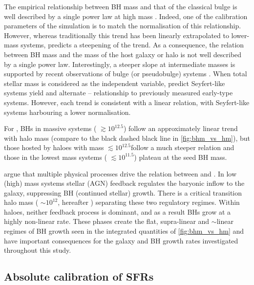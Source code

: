 The empirical relationship between BH mass and that of the classical bulge is
well described by a single power law at high mass \citep[e.g,][with gradient
values of $\alpha \approx 1-1.3$ satisfying
\cref{eq:slope1}]{Magorrian1998,Kormendy2013,McConnellandMa2013}.  Indeed, one
of the calibration parameters of the simulation is to match the normalisation
of this relationship.  However, whereas traditionally this trend has been
linearly extrapolated to lower-mass systems, \eagle predicts a steepening of
the trend.  As a consequence, the relation between BH mass and the mass of the
host galaxy or halo is not well described by a single power law. Interestingly,
a steeper slope at intermediate masses is supported by recent observations of
bulge (or pseudobulge) systems \citep[e.g,][]{Scott2013,Greene2016}.  When
total stellar mass is considered as the independent variable,
\citet{Reines2015} predict Seyfert-like systems yield and alternate
--\M{*} relationship to previously measured early-type systems. However,
each trend is consistent with a linear relation, with Seyfert-like systems
harbouring a lower normalisation.

For \eagle, BHs in massive systems ( $\gtrsim 10^{12.5}$\Msol) follow an
approximately linear trend with halo mass (compare to the black dashed black
line in \cref{fig:bhm_vs_hm}), but those hosted by haloes with mass 
$\lesssim 10^{12.5}$\Msol follow a much steeper relation and those in the
lowest mass systems ( $\lesssim 10^{11.5}$\Msol) plateau at the seed BH
mass.

\citet{Bower2017} argue that multiple physical processes drive the
relation between  and . In low (high) mass systems stellar (AGN)
feedback regulates the baryonic inflow to the galaxy, suppressing BH (continued
stellar) growth.  There is a critical transition halo mass ( $\sim
10^{12}$\Msol, hereafter ) separating these two regulatory regimes.
Within  haloes, neither feedback process is dominant, and as a result
BHs grow at a highly non-linear rate. These phases create the flat,
supra-linear and $\sim$linear regimes of BH growth seen in the integrated
quantities of \cref{fig:bhm_vs_hm} and have important consequences for the
galaxy and BH growth rates investigated throughout this study.

\subsection{Absolute calibration of SFRs}
\label{sect:sfr_calibration}


